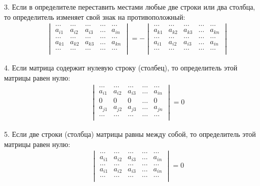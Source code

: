 \documentclass[12pt, fleqn]{extarticle}
\begin{document}
3. Если в определителе переставить местами любые две строки или два столбца, то определитель изменяет свой знак на противоположный:
\begin{align*}
     &  &
    \begin{vmatrix}
        \dots  & \dots  & \dots  & \dots & \dots  \\
        a_{i1} & a_{i2} & a_{i3} & \dots & a_{in} \\
        \dots  & \dots  & \dots  & \dots & \dots  \\
        a_{k1} & a_{k2} & a_{k3} & \dots & a_{kn} \\
        \dots  & \dots  & \dots  & \dots & \dots  \\
    \end{vmatrix}
    =
    -
    \begin{vmatrix}
        \dots  & \dots  & \dots  & \dots & \dots  \\
        a_{k1} & a_{k2} & a_{k3} & \dots & a_{kn} \\
        \dots  & \dots  & \dots  & \dots & \dots  \\
        a_{i1} & a_{i2} & a_{i3} & \dots & a_{in} \\
        \dots  & \dots  & \dots  & \dots & \dots  \\
    \end{vmatrix}
\end{align*}

4. Если матрица содержит нулевую строку (столбец), то определитель этой матрицы равен нулю:
\begin{align*}
     &  &
    \begin{vmatrix}
        \dots  & \dots  & \dots  & \dots & \dots  \\
        a_{i1} & a_{i2} & a_{i3} & \dots & a_{in} \\
        0      & 0      & 0      & \dots & 0      \\
        a_{j1} & a_{j2} & a_{j3} & \dots & a_{jn} \\
        \dots  & \dots  & \dots  & \dots & \dots  \\
    \end{vmatrix}
    = 0
\end{align*}

5. Если две строки (столбца) матрицы равны между собой, то определитель этой матрицы равен нулю:
\begin{align*}
     &  &
    \begin{vmatrix}
        \dots  & \dots  & \dots  & \dots & \dots  \\
        a_{i1} & a_{i2} & a_{i3} & \dots & a_{in} \\
        \dots  & \dots  & \dots  & \dots & \dots  \\
        a_{i1} & a_{i2} & a_{i3} & \dots & a_{in} \\
        \dots  & \dots  & \dots  & \dots & \dots  \\
    \end{vmatrix}
    = 0
\end{align*}
\end{document}
